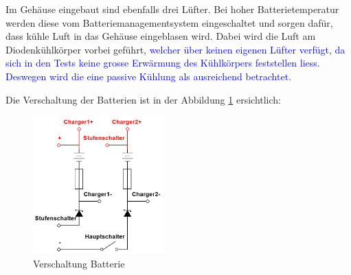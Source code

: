 Im Gehäuse eingebaut sind ebenfalls drei Lüfter. Bei hoher Batterietemperatur werden diese vom Batteriemanagementsystem eingeschaltet und sorgen dafür, dass kühle Luft in das Gehäuse eingeblasen wird. Dabei wird die Luft am Diodenkühlkörper vorbei geführt, \textcolor{blue}{welcher über keinen eigenen Lüfter verfügt, da sich in den Tests keine grosse Erwärmung des Kühlkörpers feststellen liess. Deswegen wird die eine passive Kühlung als ausreichend betrachtet}.

Die Verschaltung der Batterien ist in der Abbildung \ref{fig:versch_bat} ersichtlich:

\begin{figure}[h!]
	\centering
		\includegraphics[width=0.45\textwidth]{images/BAT.PNG}
	\caption{Verschaltung Batterie}
	\label{fig:versch_bat}
\end{figure}